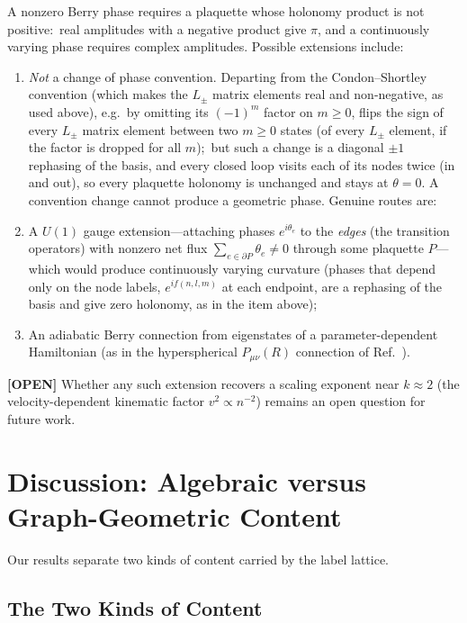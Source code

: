 \documentclass[aps,pra,twocolumn,superscriptaddress,longbibliography]{revtex4-2}
\begin{document}
A nonzero Berry phase requires a plaquette whose holonomy product is not
positive:\ real amplitudes with a negative product give $\pi$, and a
continuously varying phase requires complex amplitudes.
Possible extensions include:
\begin{enumerate}
\item \emph{Not} a change of phase convention. Departing from the
  Condon--Shortley convention (which makes the $L_\pm$ matrix elements
  real and non-negative, as used above), e.g.\ by omitting its $(-1)^m$
  factor on $m \ge 0$, flips the sign of every $L_\pm$ matrix element
  between two $m \ge 0$ states (of every $L_\pm$ element, if the factor is
  dropped for all $m$);\ but such a change is a diagonal $\pm 1$ rephasing
  of the basis, and every closed loop visits each of its nodes twice
  (in and out), so every plaquette holonomy is unchanged and stays at
  $\theta = 0$. A convention change cannot produce a geometric phase. Genuine routes are:
\item A $U(1)$ gauge extension---attaching phases $e^{i\theta_e}$ to
  the \emph{edges} (the transition operators) with nonzero net flux
  $\sum_{e \in \partial P} \theta_e \neq 0$ through some plaquette
  $P$---which would produce continuously varying curvature (phases
  that depend only on the node labels, $e^{i f(n,l,m)}$ at each
  endpoint, are a rephasing of the basis and give zero holonomy, as in
  the item above);
\item An adiabatic Berry connection from eigenstates of a
  parameter-dependent Hamiltonian (as in the hyperspherical $P_{\mu\nu}(R)$
  connection of Ref.~\cite{paper13}).
\end{enumerate}
\textbf{[OPEN]} Whether any such extension recovers a scaling exponent near $k \approx 2$
(the velocity-dependent kinematic factor $v^2 \propto n^{-2}$) remains an
open question for future work.


\section{Discussion: Algebraic versus Graph-Geometric Content}
\label{sec:discussion}

Our results separate two kinds of content carried by the label lattice.

\subsection{The Two Kinds of Content}
\end{document}
